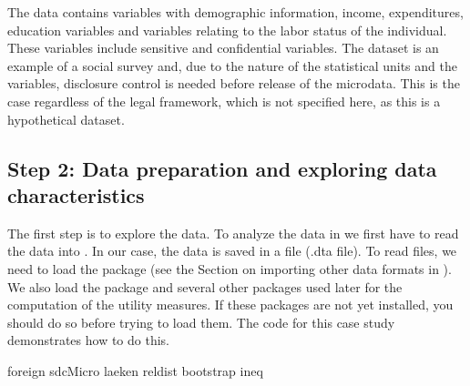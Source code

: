 \documentclass[letterpaper,10pt,english]{sphinxmanual}
\begin{document}
The data contains variables with demographic information, income,
expenditures, education variables and variables relating to the labor
status of the individual. These variables include sensitive and
confidential variables. The dataset is an example of a social survey
and, due to the nature of the statistical units and the variables,
disclosure control is needed before release of the microdata. This is
the case regardless of the legal framework, which is not specified here,
as this is a hypothetical dataset.


\subsection{Step 2: Data preparation and exploring data characteristics}
\label{\detokenize{case_studies:step-2-data-preparation-and-exploring-data-characteristics}}
The first step is to explore the data. To analyze the data in  we
first have to read the data into . In our case, the data is saved in
a  file (.dta file). To read  files, we need to load the 
package  (see the Section
on importing other data formats in
). We also load the  package and several other packages
used later for the computation of the utility measures. If these
packages are not yet installed, you should do so before trying to load
them. The  code for this case study demonstrates how to do this.

\def\sphinxLiteralBlockLabel{\label{\detokenize{case_studies:code91}}}
%
\begin{sphinxVerbatim}[commandchars=\\\{\},numbers=left,firstnumber=1,stepnumber=1]
foreign   
sdcMicro  
laeken    
reldist   
bootstrap 
ineq      
\end{sphinxVerbatim}
\end{document}
